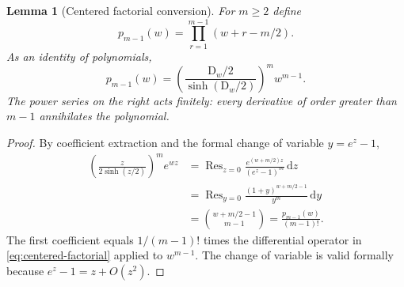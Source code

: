 \documentclass[11pt,a4paper]{article}
\numberwithin{equation}{section}
\newtheorem{lemma}[lemma]{Lemma}
\theoremstyle{definition}
\newcommand{\dd}{\,\mathrm d}
\newcommand{\D}{\mathrm D}
\newcommand{\Res}{\operatorname{Res}}
\begin{document}
\begin{lemma}[Centered factorial conversion]\label{lem:centered-factorial}
For $m\geq2$ define
\begin{equation}
 p_{m-1}(w)=\prod_{r=1}^{m-1}(w+r-m/2).
\end{equation}
As an identity of polynomials,
\begin{equation}
 p_{m-1}(w)=
 \left(\frac{\D_w/2}{\sinh(\D_w/2)}\right)^m w^{m-1}.
 \label{eq:centered-factorial}
\end{equation}
The power series on the right acts finitely: every derivative of
order greater than $m-1$ annihilates the polynomial.
\end{lemma}
\begin{proof}
By coefficient extraction and the formal change of variable
$y=e^z-1$,
\begin{align}
 [z^{m-1}]\left(\frac{z}{2\sinh(z/2)}\right)^m e^{wz}
 &=\Res_{z=0}\frac{e^{(w+m/2)z}}{(e^z-1)^m}\dd z\nonumber\\
 &=\Res_{y=0}\frac{(1+y)^{w+m/2-1}}{y^m}\dd y\nonumber\\
 &=\binom{w+m/2-1}{m-1}
 =\frac{p_{m-1}(w)}{(m-1)!}.
 \label{eq:residue-factorial}
\end{align}
The first coefficient equals $1/(m-1)!$ times the differential
operator in \eqref{eq:centered-factorial} applied to $w^{m-1}$.
The change of variable is valid formally because $e^z-1=z+O(z^2)$.
\end{proof}
\end{document}
